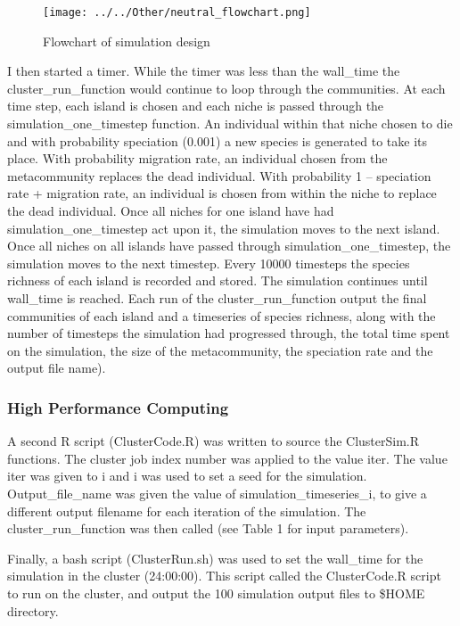\documentclass{article}
\begin{document}
 \begin{figure}[h!]
\centering
  \texttt{[image: ../../Other/neutral\_flowchart.png]}
  \caption{Flowchart of simulation design}
  \label{fig:Flowchart}
\end{figure}
 
I then started a timer. While the timer was less than the wall\_time the cluster\_run\_function would continue to loop through the communities. At each time step, each island is chosen and each niche is passed through the simulation\_one\_timestep function.  An individual within that niche chosen to die and with probability speciation (0.001) a new species is generated to take its place. With probability migration rate, an individual chosen from the metacommunity replaces the dead individual. With probability 1 – speciation rate + migration rate, an individual is chosen from within the niche to replace the dead individual. Once all niches for one island have had simulation\_one\_timestep act upon it, the simulation moves to the next island. Once all niches on all islands have passed through simulation\_one\_timestep, the simulation moves to the next timestep. Every 10000 timesteps the species richness of each island is recorded and stored. The simulation continues until wall\_time is reached. Each run of the cluster\_run\_function output the final communities of each island and a timeseries of species richness, along with the number of timesteps the simulation had progressed through, the total time spent on the simulation, the size of the metacommunity, the speciation rate and the output file name). \bigskip

\subsubsection{High Performance Computing}
A second R script (ClusterCode.R) was written to source the ClusterSim.R functions. The cluster job index number was applied to the value iter. The value iter was given to i and i was used to set a seed for the simulation. Output\_file\_name was given the value of simulation\_timeseries\_i, to give a different output filename for each iteration of the simulation. The cluster\_run\_function was then called (see Table 1 for input parameters). \bigskip

Finally, a bash script (ClusterRun.sh) was used to set the wall\_time for the simulation in the cluster (24:00:00). This script called the ClusterCode.R script to run on the cluster, and output the 100 simulation output files to \$HOME directory. \bigskip
\end{document}

